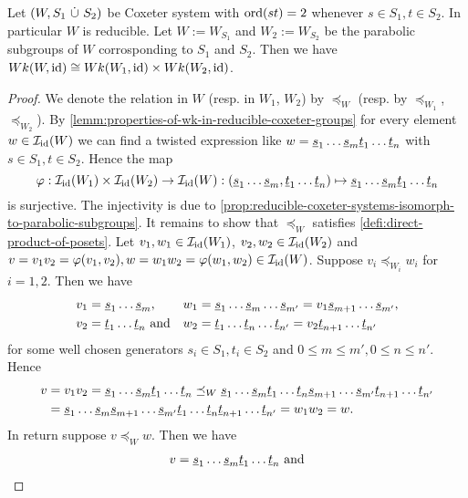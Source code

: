 \begin{coro}
	Let $(W,S_1 \ \dot \cup \  S_2)$ be Coxeter system with $\operatorname{ord}(st) = 2$ whenever $s \in S_1, t \in S_2$. In particular $W$ is reducible. Let $W := W_{S_1}$ and $W_2 := W_{S_2}$ be the parabolic subgroups of $W$ corrosponding to $S_1$ and $S_2$. Then we have $Wk(W,\operatorname{id}) \cong Wk(W_1,\operatorname{id}) \times Wk(W_2,\operatorname{id})$.

	\begin{proof}
		We denote the relation in $W$ (resp. in $W_1$, $W_2$) by $\preceq_W$ (resp. by $\preceq_{W_1}$, $\preceq_{W_2}$). By \ref{lemm:properties-of-wk-in-reducible-coxeter-groups} for every element $w \in \mathcal{I}_{\operatorname{id}}(W)$ we can find a twisted expression like $w = \underline{s}_1 \ldots \underline{s}_m \underline{t}_1 \ldots \underline{t}_n$ with $s \in S_1, t \in S_2$. Hence the map
		$$ \varphi : \mathcal{I}_{\operatorname{id}}(W_1) \times \mathcal{I}_{\operatorname{id}}(W_2) \to \mathcal{I}_{\operatorname{id}}(W) : (\underline{s}_1 \ldots \underline{s}_m, \underline{t}_1 \ldots \underline{t}_n) \mapsto \underline{s}_1 \ldots \underline{s}_m \underline{t}_1 \ldots \underline{t}_n $$
		is surjective. The injectivity is due to \ref{prop:reducible-coxeter-systems-isomorph-to-parabolic-subgroups}. It remains to show that $\preceq_W$ satisfies \ref{defi:direct-product-of-posets}. Let $v_1,w_1 \in \mathcal{I}_{\operatorname{id}}(W_1)$, $v_2,w_2 \in \mathcal{I}_{\operatorname{id}}(W_2)$ and $v = v_1v_2 = \varphi(v_1,v_2), w = w_1w_2 = \varphi(w_1,w_2) \in \mathcal{I}_{\operatorname{id}}(W)$. Suppose $v_i \preceq_{W_i} w_i$ for $i=1,2$. Then we have
		\begin{align*}
			v_1	& = \underline{s}_1 \ldots \underline{s}_m, &
			w_1	& = \underline{s}_1 \ldots \underline{s}_m \ldots \underline{s}_{m'} = v_1 \underline{s}_{m+1} \ldots \underline{s}_{m'}, \\
			v_2	& = \underline{t}_1 \ldots \underline{t}_n \textrm{ and} &
			w_2	& = \underline{t}_1 \ldots \underline{t}_n \ldots \underline{t}_{n'} = v_2 \underline{t}_{n+1} \ldots \underline{t}_{n'}
		\end{align*}
		for some well chosen generators $s_i \in S_1, t_i \in S_2$ and $0 \leq m \leq m', 0 \leq n \leq n'$. Hence
		\begin{align*}
			v	& = v_1 v_2 = \underline{s}_1 \ldots \underline{s}_m \underline{t}_1 \ldots \underline{t}_n \preceq_W \underline{s}_1 \ldots \underline{s}_m \underline{t}_1 \ldots \underline{t}_n \underline{s}_{m+1} \ldots \underline{s}_{m'} \underline{t}_{n+1} \ldots \underline{t}_{n'} \\
				& = \underline{s}_1 \ldots \underline{s}_m \underline{s}_{m+1} \ldots \underline{s}_{m'} \underline{t}_1 \ldots \underline{t}_n  \underline{t}_{n+1} \ldots \underline{t}_{n'} = w_1 w_2 = w.
		\end{align*}
		In return suppose $v \preceq_W w$. Then we have
		\begin{align*}
			v	& = \ul s_1 \ldots \ul s_m \ul t_1 \ldots \ul t_n \textrm{ and} \\

\end{align*}
\end{proof}
\end{coro}
